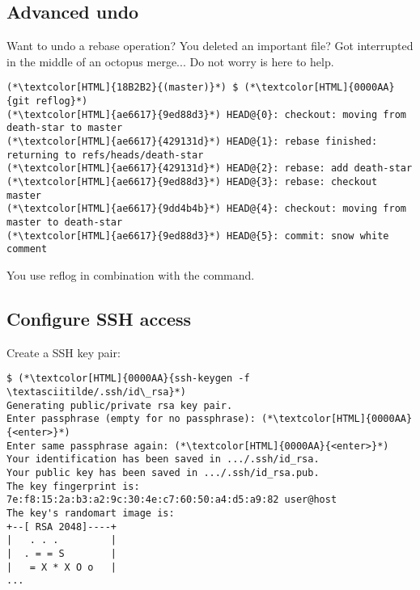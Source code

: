 \subsection{Advanced undo}
\begin{frame}[fragile]
    \subslidetitle

  Want to undo a rebase operation? You deleted an important file? Got interrupted in the middle of an octopus merge... Do not worry  is here to help.

  \begin{lstlisting}
(*\textcolor[HTML]{18B2B2}{(master)}*) $ (*\textcolor[HTML]{0000AA}{git reflog}*)
(*\textcolor[HTML]{ae6617}{9ed88d3}*) HEAD@{0}: checkout: moving from death-star to master
(*\textcolor[HTML]{ae6617}{429131d}*) HEAD@{1}: rebase finished: returning to refs/heads/death-star
(*\textcolor[HTML]{ae6617}{429131d}*) HEAD@{2}: rebase: add death-star
(*\textcolor[HTML]{ae6617}{9ed88d3}*) HEAD@{3}: rebase: checkout master
(*\textcolor[HTML]{ae6617}{9dd4b4b}*) HEAD@{4}: checkout: moving from master to death-star
(*\textcolor[HTML]{ae6617}{9ed88d3}*) HEAD@{5}: commit: snow white comment
\end{lstlisting}

  You use reflog in combination with the  command.
\end{frame}

\subsection{Configure SSH access}
\begin{frame}[fragile]
  \subslidetitle
  Create a SSH key pair:
  \begin{lstlisting}
$ (*\textcolor[HTML]{0000AA}{ssh-keygen -f \textasciitilde/.ssh/id\_rsa}*)
Generating public/private rsa key pair.
Enter passphrase (empty for no passphrase): (*\textcolor[HTML]{0000AA}{<enter>}*)
Enter same passphrase again: (*\textcolor[HTML]{0000AA}{<enter>}*)
Your identification has been saved in .../.ssh/id_rsa.
Your public key has been saved in .../.ssh/id_rsa.pub.
The key fingerprint is:
7e:f8:15:2a:b3:a2:9c:30:4e:c7:60:50:a4:d5:a9:82 user@host
The key's randomart image is:
+--[ RSA 2048]----+
|   . . .         |
|  . = = S        |
|   = X * X O o   |
...
\end{lstlisting}
\end{frame}

